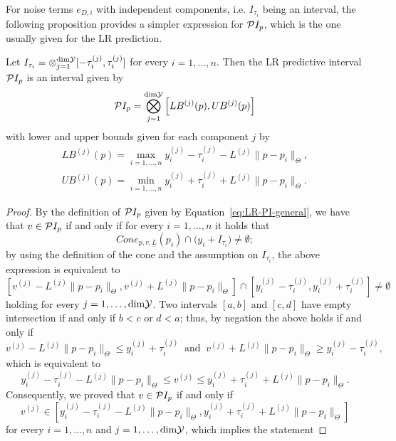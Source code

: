 For noise terms $e_{D,i}$ with independent components, i.e. $I_{\tau_i}$ being an interval, the following proposition provides a simpler expression for $\mathcal PI_p$, which is the one usually given for the LR prediction.
\begin{prp}\label{prp:LR-PI}
    Let $I_{\tau_i} = \otimes_{j=1}^{\text{dim}\mathcal Y} [ -\tau_i^{(j)}, \tau_i^{(j)} ]$ for every $i = 1, \dots, n$.
    Then the LR predictive interval $\mathcal PI_p$ is an interval given by
    \begin{equation}\label{eq:LR-PI}
        \mathcal PI_p = \bigotimes_{j=1}^{\text{dim}\mathcal Y} \left[ LB^{(j)}(p), UB^{(j)}(p)\right]
    \end{equation}
    with lower and upper bounds given for each component $j$ by
    \begin{equation} \label{eq:LR-bounds}
    \begin{gathered}
        LB^{(j)}(p) = \max_{i=1,\dots,n} y_i^{(j)} - \tau_i^{(j)} - L^{(j)} \| p - p_i \|_\Theta, \\
        UB^{(j)}(p) = \min_{i=1,\dots,n} y_i^{(j)} + \tau_i^{(j)} + L^{(j)} \| p - p_i \|_\Theta.
    \end{gathered}
    \end{equation}
\end{prp}
\begin{proof}
    By the definition of $\mathcal PI_p$ given by Equation~\eqref{eq:LR-PI-general}, we have that $v\in \mathcal PI_p$ if and only if for every $i = 1, \dots, n$ it holds that
    \[
    Cone_{p,v,\underline L}(p_i) \cap  \big ( y_i + I_{\tau_i} \big ) \neq \emptyset;
    \]
    by using the definition of the cone and the assumption on $I_{\tau_i}$, the above expression is equivalent to 
    \[
        \left[ v^{(j)} - L^{(j)} \|p-p_i\|_\Theta, v^{(j)} + L^{(j)} \|p-p_i\|_\Theta \right] \cap  \left[ y_i^{(j)} - \tau_i^{(j)}, y_i^{(j)} + \tau_i^{(j)} \right] \neq \emptyset
    \]
    holding for every $j = 1, \dots, \text{dim} \mathcal Y$. \newline
    Two intervals $[a,b]$ and $[c,d]$ have empty intersection if and only if $b < c$ or $d < a$; thus, by negation the above holds if and only if
    \[
        v^{(j)} - L^{(j)} \|p-p_i\|_\Theta \leq y_i^{(j)} + \tau_i^{(j)} \ \text{ and } \ v^{(j)} + L^{(j)} \|p-p_i\|_\Theta \geq y_i^{(j)} - \tau_i^{(j)},
    \] which is equivalent to 
    \[
        y_i^{(j)} - \tau_i^{(j)} - L^{(j)} \|p-p_i\|_\Theta \leq v^{(j)} \leq y_i^{(j)} + \tau_i^{(j)} + L^{(j)} \|p-p_i\|_\Theta.
    \]
    Consequently, we proved that $v \in \mathcal PI_p$ if and only if
    \[
        v^{(j)} \in \left[ y_i^{(j)} - \tau_i^{(j)} - L^{(j)} \|p-p_i\|_\Theta, y_i^{(j)} + \tau_i^{(j)} + L^{(j)} \|p-p_i\|_\Theta \right]
    \]
    for every $i = 1, \dots, n$ and $j = 1, \dots, \text{dim} \mathcal Y$, which implies the statement
\end{proof}

